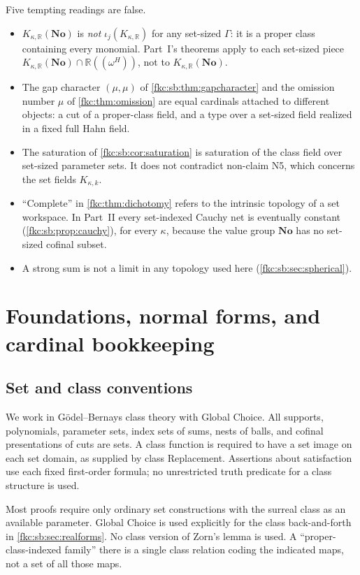 \documentclass[11pt,letterpaper]{article}
\numberwithin{equation}{section}
\theoremstyle{definition}
\theoremstyle{remark}
\newcommand{\R}{\mathbb R}
\newcommand{\No}{\mathbf{No}}
\newcommand{\K}{K_{\kappa,k}}
\newcommand{\KN}[2]{K_{#1,#2}(\No)}%
\begin{document}
Five tempting readings are false.
\begin{itemize}
\item $\KN\kappa\R$ is \emph{not} $\iota_j(K_{\kappa,\R})$ for any set-sized $\Gamma$: it is a proper class containing every monomial. Part~I's theorems apply to each set-sized piece $\KN\kappa\R\cap\R((\omega^H))$, not to $\KN\kappa\R$.
\item The gap character $(\mu,\mu)$ of \cref{fkc:sb:thm:gapcharacter} and the omission number $\mu$ of \cref{fkc:thm:omission} are equal cardinals attached to different objects: a cut of a proper-class field, and a type over a set-sized field realized in a fixed full Hahn field.
\item The saturation of \cref{fkc:sb:cor:saturation} is saturation of the class field over set-sized parameter sets. It does not contradict non-claim N5, which concerns the set fields $\K$.
\item ``Complete'' in \cref{fkc:thm:dichotomy} refers to the intrinsic topology of a set workspace. In Part~II every set-indexed Cauchy net is eventually constant (\cref{fkc:sb:prop:cauchy}), for every $\kappa$, because the value group $\No$ has no set-sized cofinal subset.
\item A strong sum is not a limit in any topology used here (\cref{fkc:sb:sec:spherical}).
\end{itemize}

\section{Foundations, normal forms, and cardinal bookkeeping}\label{fkc:sb:sec:setup}

\subsection{Set and class conventions}
We work in G\"odel--Bernays class theory with Global Choice. All supports, polynomials, parameter sets, index sets of sums, nests of balls, and cofinal presentations of cuts are sets. A class function is required to have a set image on each set domain, as supplied by class Replacement. Assertions about satisfaction use each fixed first-order formula; no unrestricted truth predicate for a class structure is used.

Most proofs require only ordinary set constructions with the surreal class as an available parameter. Global Choice is used explicitly for the class back-and-forth in \cref{fkc:sb:sec:realforms}. No class version of Zorn's lemma is used. A ``proper-class-indexed family'' there is a single class relation coding the indicated maps, not a set of all those maps.
\end{document}

